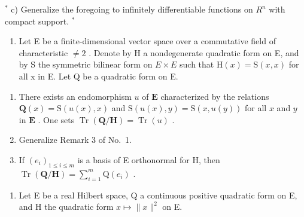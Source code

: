 \(^{*}\) c) Generalize the foregoing to infinitely differentiable functions on \(R^{n}\) with compact support. \(^{*}\)


\begin{enumerate}
\def\labelenumi{\arabic{enumi})}
\tightlist
\item
  Let E be a finite-dimensional vector space over a commutative field of characteristic \(\neq 2\) . Denote by H a nondegenerate quadratic form on E, and by S the symmetric bilinear form on \(E \times E\) such that \(\mathrm{H}(x) = \mathrm{S}(x, x)\) for all x in E. Let Q be a quadratic form on E.
\end{enumerate}

\begin{enumerate}
\def\labelenumi{\alph{enumi})}
\item
  There exists an endomorphism \(u\) of \(\mathbf{E}\) characterized by the relations \(\mathbf{Q}(x) = \mathrm{S}(u(x), x)\) and \(\mathrm{S}(u(x), y) = \mathrm{S}(x, u(y))\) for all \(x\) and \(y\) in \(\mathbf{E}\) . One sets \(\operatorname{Tr}(\mathbf{Q}/\mathbf{H}) = \operatorname{Tr}(u)\) .
\item
  Generalize Remark 3 of No.~1.
\item
  If \((e_i)_{1\leqslant i\leqslant m}\) is a basis of E orthonormal for H, then \(\operatorname{Tr}(\mathbf{Q}/\mathbf{H}) = \sum_{i=1}^{m}\mathrm{Q}(e_i)\) .
\end{enumerate}

\begin{enumerate}
\def\labelenumi{\arabic{enumi})}
\setcounter{enumi}{1}
\tightlist
\item
  Let E be a real Hilbert space, Q a continuous positive quadratic form on E, and H the quadratic form \(x \mapsto \|x\|^2\) on E.
\end{enumerate}

